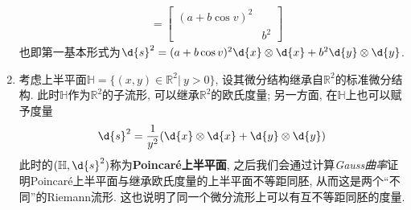 \begin{eg}
\begin{enumerate}[(1)]
\begin{align*}
            &=\begin{bmatrix}
                (a+b\cos{v})^2 & \\ & b^2
            \end{bmatrix}
        \end{align*}
        也即第一基本形式为$\d{s}^2=(a+b\cos{v})^2\d{x}\otimes\d{x}+b^2\d{y}\otimes\d{y}$.
        \item 考虑上半平面$\mathbb{H}=\{(x,y)\in\mathbb{R}^2|\ y>0\}$, 设其微分结构继承自$\mathbb{R}^2$的标准微分结构.
        此时$\mathbb{H}$作为$\mathbb{R}^2$的子流形, 可以继承$\mathbb{R}^2$的欧氏度量;
        另一方面, 在$\mathbb{H}$上也可以赋予度量
        \[\d{s}^2=\frac{1}{y^2}(\d{x}\otimes\d{x}+\d{y}\otimes\d{y})\]
        此时的$(\mathbb{H},\d{s}^2)$称为\textbf{Poincar\'{e}上半平面}, 之后我们会通过计算\textit{Gauss曲率}证明Poincar\'{e}上半平面与继承欧氏度量的上半平面不等距同胚, 从而这是两个``不同''的Riemann流形.
        这也说明了同一个微分流形上可以有互不等距同胚的度量.
    \end{enumerate}
\end{eg}